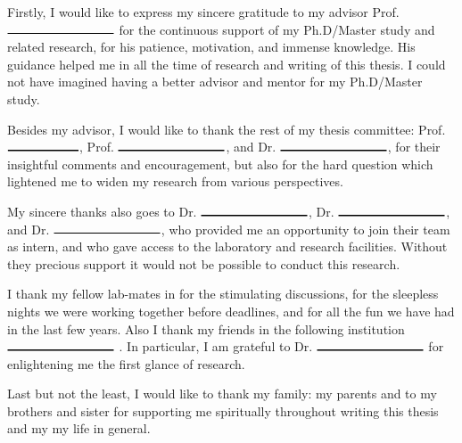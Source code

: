 Firstly, I would like to express my sincere gratitude to my advisor Prof.$\rule{3cm}{0.3mm}$ for the continuous support of my Ph.D/Master study and related research, for his patience, motivation, and immense knowledge. His guidance helped me in all the time of research and writing of this thesis. I could not have imagined having a better advisor and mentor for my Ph.D/Master study.

Besides my advisor, I would like to thank the rest of my thesis committee: Prof. $\rule{2cm}{0.3mm}$, Prof. $\rule{3cm}{0.3mm}$, and Dr. $\rule{3cm}{0.3mm}$, for their insightful comments and encouragement, but also for the hard question which lightened me to widen my research from various perspectives.

My sincere thanks also goes to Dr. $\rule{3cm}{0.3mm}$, Dr. $\rule{3cm}{0.3mm}$, and Dr. $\rule{3cm}{0.3mm}$, who provided me an opportunity to join their team as intern, and who gave access to the laboratory and research facilities. Without they precious support it would not be possible to conduct this research.

I thank my fellow lab-mates in for the stimulating discussions, for the sleepless nights we were working together before deadlines, and for all the fun we have had in the last few years. Also I thank my friends in the following institution $\rule{3cm}{0.3mm}$ . In particular, I am grateful to Dr. $\rule{3cm}{0.3mm}$ for enlightening me the first glance of research.

Last but not the least, I would like to thank my family: my parents and to my brothers and sister for supporting me spiritually throughout writing this thesis and my my life in general.